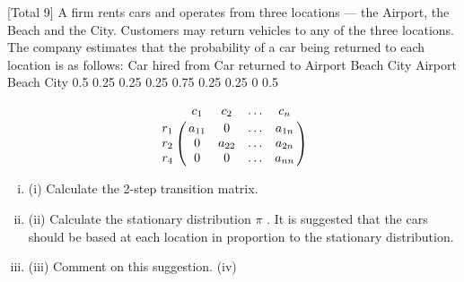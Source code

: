 \documentclass[a4paper,12pt]{article}
\begin{document}
[Total 9]
A firm rents cars and operates from three locations — the Airport, the Beach and the
City. Customers may return vehicles to any of the three locations.
The company estimates that the probability of a car being returned to each location is
as follows:
Car hired from Car returned to
Airport Beach City
Airport
Beach
City 0.5
0.25
0.25
0.25
0.75
0.25
0.25
0
0.5

$$\bordermatrix{ &c_1&c_2&\ldots &c_n\cr
    r_1&a_{11} &  0  & \ldots & a_{1n}\cr
    r_2& 0  &  a_{22} & \ldots & a_{2n}\cr
    r_4& 0  &   0 &\ldots & a_{nn}}$$
    
\begin{enumerate}[(i)]
\item (i) Calculate the 2-step transition matrix. 
\item (ii) Calculate the stationary distribution $\pi$ . 
It is suggested that the cars should be based at each location in proportion to the
stationary distribution.
\item (iii)
Comment on this suggestion.
(iv)
\end{enumerate}
\end{document}
